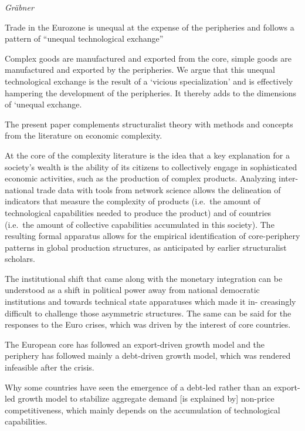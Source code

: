\documentclass[
]{book}
\begin{document}
\emph{Gräbner}

Trade in the Eurozone is unequal at the expense of the peripheries
and follows a pattern of ``unequal technological exchange''

Complex goods are manufactured and exported from the core, simple goods are manufactured and exported by the peripheries. We argue that this unequal technological exchange is the result of a `vicious specialization' and is effectively hampering the development of the peripheries. It thereby adds to the dimensions of `unequal exchange.

The present paper complements structuralist theory with
methods and concepts from the literature on economic complexity.

At the core of the complexity literature is the idea that a key
explanation for a society's wealth is the ability of its citizens
to collectively engage in sophisticated economic activities,
such as the production of complex products. Analyzing inter-
national trade data with tools from network science allows the delineation of indicators
that measure the complexity of products (i.e.~the amount
of technological capabilities needed to produce the product)
and of countries (i.e.~the amount of collective capabilities
accumulated in this society). The resulting formal apparatus allows
for the empirical identification of core-periphery
patterns in global production structures, as anticipated by
earlier structuralist scholars.

The institutional shift that came along with
the monetary integration can be understood as a shift in
political power away from national democratic institutions
and towards technical state apparatuses which made it in-
creasingly difficult to challenge those asymmetric structures.
The same can be said for
the responses to the Euro crises, which was driven by the
interest of core countries.

The European core has followed
an export-driven growth model and the periphery has
followed mainly a debt-driven growth model, which was
rendered infeasible after the crisis.

Why some countries have seen the emergence of a debt-led rather
than an export-led growth model to stabilize aggregate
demand {[}is explained by{]} non-price competitiveness,
which mainly depends on the accumulation of technological capabilities.
\end{document}
